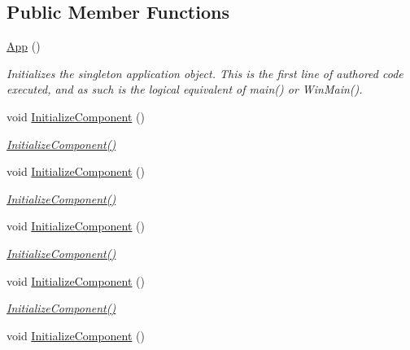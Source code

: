 \subsection*{Public Member Functions}
\begin{DoxyCompactItemize}
\item 
\mbox{\hyperlink{class_r_f_storage_1_1_app_a69692c21260af99112f45c3471da8370}{App}} ()
\begin{DoxyCompactList}\small\item\em Initializes the singleton application object. This is the first line of authored code executed, and as such is the logical equivalent of main() or Win\+Main(). \end{DoxyCompactList}\item 
void \mbox{\hyperlink{class_r_f_storage_1_1_app_aee12f2c565f216fc400227a9c9446954}{Initialize\+Component}} ()
\begin{DoxyCompactList}\small\item\em \mbox{\hyperlink{class_r_f_storage_1_1_app_aee12f2c565f216fc400227a9c9446954}{Initialize\+Component()}} \end{DoxyCompactList}\item 
void \mbox{\hyperlink{class_r_f_storage_1_1_app_aee12f2c565f216fc400227a9c9446954}{Initialize\+Component}} ()
\begin{DoxyCompactList}\small\item\em \mbox{\hyperlink{class_r_f_storage_1_1_app_aee12f2c565f216fc400227a9c9446954}{Initialize\+Component()}} \end{DoxyCompactList}\item 
void \mbox{\hyperlink{class_r_f_storage_1_1_app_aee12f2c565f216fc400227a9c9446954}{Initialize\+Component}} ()
\begin{DoxyCompactList}\small\item\em \mbox{\hyperlink{class_r_f_storage_1_1_app_aee12f2c565f216fc400227a9c9446954}{Initialize\+Component()}} \end{DoxyCompactList}\item 
void \mbox{\hyperlink{class_r_f_storage_1_1_app_aee12f2c565f216fc400227a9c9446954}{Initialize\+Component}} ()
\begin{DoxyCompactList}\small\item\em \mbox{\hyperlink{class_r_f_storage_1_1_app_aee12f2c565f216fc400227a9c9446954}{Initialize\+Component()}} \end{DoxyCompactList}\item 
void \mbox{\hyperlink{class_r_f_storage_1_1_app_aee12f2c565f216fc400227a9c9446954}{Initialize\+Component}} ()

\end{DoxyCompactItemize}
